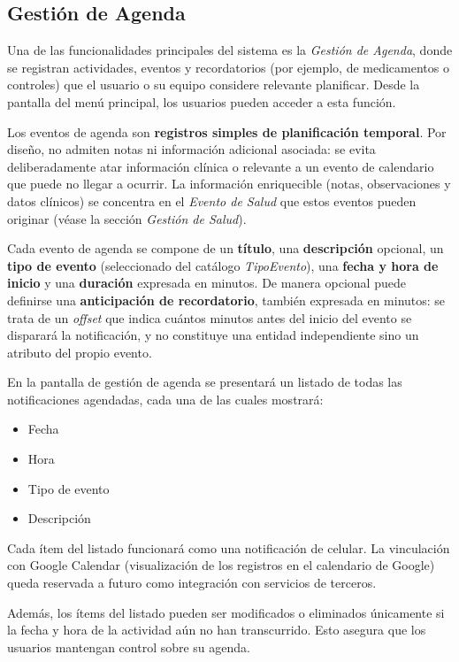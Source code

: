 \documentclass[a4paper,12pt]{article}
\begin{document}
    \subsection{Gestión de Agenda}
    \par Una de las funcionalidades principales del sistema es la \textit{Gestión de Agenda}, donde se registran actividades, eventos y recordatorios (por ejemplo, de medicamentos o controles) que el usuario o su equipo considere relevante planificar. Desde la pantalla del menú principal, los usuarios pueden acceder a esta función.
    \par Los eventos de agenda son \textbf{registros simples de planificación temporal}. Por diseño, no admiten notas ni información adicional asociada: se evita deliberadamente atar información clínica o relevante a un evento de calendario que puede no llegar a ocurrir. La información enriquecible (notas, observaciones y datos clínicos) se concentra en el \textit{Evento de Salud} que estos eventos pueden originar (véase la sección \textit{Gestión de Salud}).
    \par Cada evento de agenda se compone de un \textbf{título}, una \textbf{descripción} opcional, un \textbf{tipo de evento} (seleccionado del catálogo \textit{TipoEvento}), una \textbf{fecha y hora de inicio} y una \textbf{duración} expresada en minutos. De manera opcional puede definirse una \textbf{anticipación de recordatorio}, también expresada en minutos: se trata de un \textit{offset} que indica cuántos minutos antes del inicio del evento se disparará la notificación, y no constituye una entidad independiente sino un atributo del propio evento.
    \par En la pantalla de gestión de agenda se presentará un listado de todas las notificaciones agendadas, cada una de las cuales mostrará:
    \begin{itemize}
        \item Fecha
        \item Hora
        \item Tipo de evento
        \item Descripción
    \end{itemize}
    \par Cada ítem del listado funcionará como una notificación de celular. La vinculación con Google Calendar (visualización de los registros en el calendario de Google) queda reservada a futuro como integración con servicios de terceros.
    \par Además, los ítems del listado pueden ser modificados o eliminados únicamente si la fecha y hora de la actividad aún no han transcurrido. Esto asegura que los usuarios mantengan control sobre su agenda.
\end{document}
